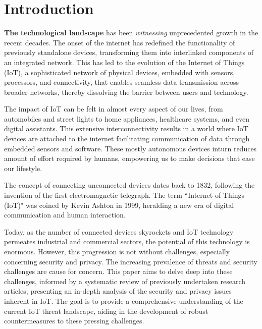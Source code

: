 

\section{Introduction}
\label{sec:introduction}
%
%

\textbf{The technological landscape} has been \textit{witnessing} unprecedented growth in the recent decades. The onset of the internet has redefined the functionality of previously standalone devices, transforming them into interlinked components of an integrated network. This has led to the evolution of the Internet of Things (IoT), a sophisticated network of physical devices, embedded with sensors, processors, and connectivity, that enables seamless data transmission across broader networks, thereby dissolving the barrier between users and technology.

The impact of \gls{IoT} can be felt in almost every aspect of our lives, from automobiles and street lights to home appliances, healthcare systems, and even digital assistants. This extensive interconnectivity results in a world where IoT devices are attached to the internet facilitating communication of data through embedded sensors and software\cite{Hukkeri}. These mostly autonomous devices inturn reduces amount of effort required by humans, empowering us to make decisions that ease our lifestyle.

The concept of connecting unconnected devices dates back to 1832, following the invention of the first electromagnetic telegraph. The term ``Internet of Things (IoT)" was coined by Kevin Ashton in 1999, heralding a new era of digital communication and human interaction.


Today, as the number of connected devices skyrockets and IoT technology permeates industrial and commercial sectors, the potential of this technology is enormous. However, this progression is not without challenges, especially concerning security and privacy. The increasing prevalence of threats and security challenges are cause for concern. This paper aims to delve deep into these challenges, informed by a systematic review of previously undertaken research articles, presenting an in-depth analysis of the security and privacy issues inherent in IoT. The goal is to provide a comprehensive understanding of the current IoT threat landscape, aiding in the development of robust countermeasures to these pressing challenges.
